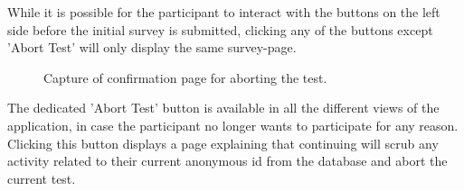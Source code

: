 {  While it is possible for the participant to interact with the buttons on
  the left side before the initial survey is submitted, clicking any of the
  buttons except 'Abort Test' will only display the same survey-page.

  \begin{figure}[h!]
    \centering
    \caption{Capture of confirmation page for aborting the test.}
    \label{label_abort}
  \end{figure}

  The dedicated 'Abort Test' button is available in all the different
  views of the application, in case the participant no longer wants to
  participate for any reason. Clicking this button displays a page
  explaining that continuing will scrub any activity related to their
  current anonymous id from the database and abort the current test.




}
